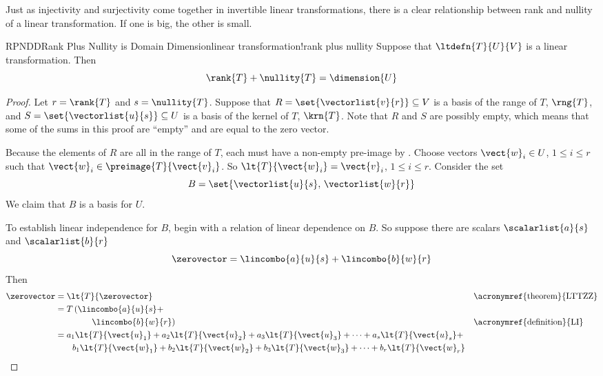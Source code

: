 %
Just as injectivity and surjectivity come together in invertible linear transformations, there is a clear relationship between rank and nullity of a linear transformation.  If one is big, the other is small.
%
\begin{theorem}{RPNDD}{Rank Plus Nullity is Domain Dimension}{linear transformation!rank plus nullity}
Suppose that $\ltdefn{T}{U}{V}$ is a linear transformation.  Then
%
\begin{equation*}
\rank{T}+\nullity{T}=\dimension{U}
\end{equation*}
%
\end{theorem}
%
\begin{proof}
Let $r=\rank{T}$ and $s=\nullity{T}$.  Suppose that $R=\set{\vectorlist{v}{r}}\subseteq V$ is a basis of the range of $T$, $\rng{T}$, and $S=\set{\vectorlist{u}{s}}\subseteq U$ is a basis of the kernel of $T$, $\krn{T}$.  Note that $R$ and $S$ are possibly empty, which means that some of the sums in this proof are ``empty'' and are equal to the zero vector.\par
%
Because the elements of $R$ are all in the range of $T$, each must have a non-empty pre-image by .  Choose vectors $\vect{w}_i\in U$, $1\leq i\leq r$ such that $\vect{w}_i\in\preimage{T}{\vect{v}_i}$.  So $\lt{T}{\vect{w}_i}=\vect{v}_i$, $1\leq i\leq r$.  Consider the set 
%
\begin{equation*}
B=\set{\vectorlist{u}{s},\,\vectorlist{w}{r}}
\end{equation*}
%
We claim that $B$ is a basis for $U$.\par
%
To establish linear independence for $B$, begin with a relation of linear dependence on $B$.  So suppose there are scalars $\scalarlist{a}{s}$ and $\scalarlist{b}{r}$
%
\begin{equation*}
\zerovector=\lincombo{a}{u}{s}+\lincombo{b}{w}{r}
\end{equation*}
%
Then
%
\begin{align*}
\zerovector&=\lt{T}{\zerovector}&&\text{\acronymref{theorem}{LTTZZ}}\\
%
&=T\left(\lincombo{a}{u}{s}+\right.\\
&\quad\quad\quad\quad\left.\lincombo{b}{w}{r}\right)&&\text{\acronymref{definition}{LI}}\\
%
&=a_1\lt{T}{\vect{u}_1}+a_2\lt{T}{\vect{u}_2}+a_3\lt{T}{\vect{u}_3}+\cdots+a_s\lt{T}{\vect{u}_s}+\\
&\quad\quad b_1\lt{T}{\vect{w}_1}+b_2\lt{T}{\vect{w}_2}+b_3\lt{T}{\vect{w}_3}+\cdots+b_r\lt{T}{\vect{w}_r}

\end{align*}
\end{proof}
